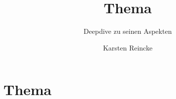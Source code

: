 \documentclass[
  DIV=calc,
  BCOR=5mm,
  11pt,
  headings=small,
  oneside,
  abstract=true,
  toc=bib,
  english,ngerman]{scrartcl}
\def\bibGl{../../../bib.gl}
\def\cfgGl{../../../cfg.gl/}
\def\cfgLf{../../cfg.lf}
\begin{document}
\nocite{*}

\titlehead{Ausbildung zur Fachinformatikerin}
\subject{Release }
\title{Thema}

\subtitle{Deepdive zu seinen Aspekten}
\author{Karsten Reincke}

\maketitle


\section{Thema}





\printnomenclature
\end{document}
